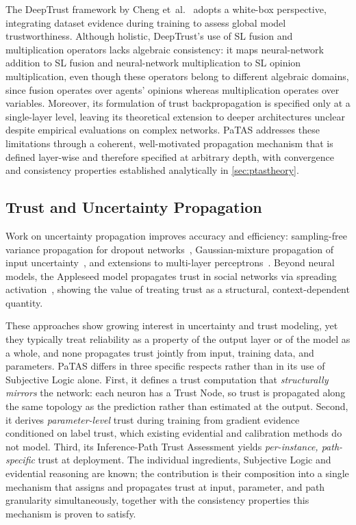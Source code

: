 The DeepTrust framework by Cheng et~al.~\cite{10.3389/frai.2020.00054} adopts a white-box perspective, integrating dataset evidence during training to assess global model trustworthiness. Although holistic, DeepTrust's use of SL fusion and multiplication operators lacks algebraic consistency: it maps neural-network addition to SL fusion and neural-network multiplication to SL opinion multiplication, even though these operators belong to different algebraic domains, since fusion operates over agents' opinions whereas multiplication operates over variables. Moreover, its formulation of trust backpropagation is specified only at a single-layer level, leaving its theoretical extension to deeper architectures unclear despite empirical evaluations on complex networks. PaTAS addresses these limitations through a coherent, well-motivated propagation mechanism that is defined layer-wise and therefore specified at arbitrary depth, with convergence and consistency properties established analytically in \cref{sec:ptastheory}.
\vspace{-0.5em}
\subsection{Trust and Uncertainty Propagation}

Work on uncertainty propagation improves accuracy and efficiency: sampling-free variance propagation for dropout networks~\cite{MAE2021394}, Gaussian-mixture propagation of input uncertainty~\cite{pmlr-v202-monchot23a}, and extensions to multi-layer perceptrons~\cite{astudillo2011propagation}. Beyond neural models, the Appleseed model propagates trust in social networks via spreading activation~\cite{ziegler2004spreading}, showing the value of treating trust as a structural, context-dependent quantity.

These approaches show growing interest in uncertainty and trust modeling, yet they typically treat reliability as a property of the output layer or of the model as a whole, and none propagates trust jointly from input, training data, and parameters. PaTAS differs in three specific respects rather than in its use of Subjective Logic alone. First, it defines a trust computation that \emph{structurally mirrors} the network: each neuron has a Trust Node, so trust is propagated along the same topology as the prediction rather than estimated at the output. Second, it derives \emph{parameter-level} trust during training from gradient evidence conditioned on label trust, which existing evidential and calibration methods do not model. Third, its Inference-Path Trust Assessment yields \emph{per-instance, path-specific} trust at deployment. The individual ingredients, Subjective Logic and evidential reasoning are known; the contribution is their composition into a single mechanism that assigns and propagates trust at input, parameter, and path granularity simultaneously, together with the consistency properties this mechanism is proven to satisfy.